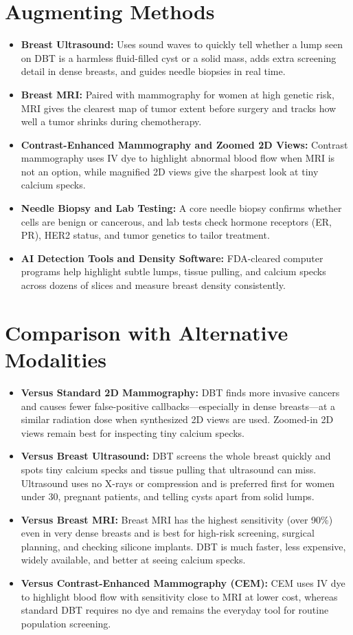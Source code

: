 \section{Augmenting Methods}
\begin{itemize}
\item \textbf{Breast Ultrasound:} Uses sound waves to quickly tell whether a lump seen on DBT is a harmless fluid-filled cyst or a solid mass, adds extra screening detail in dense breasts, and guides needle biopsies in real time.
\item \textbf{Breast MRI:} Paired with mammography for women at high genetic risk, MRI gives the clearest map of tumor extent before surgery and tracks how well a tumor shrinks during chemotherapy.
\item \textbf{Contrast-Enhanced Mammography and Zoomed 2D Views:} Contrast mammography uses IV dye to highlight abnormal blood flow when MRI is not an option, while magnified 2D views give the sharpest look at tiny calcium specks.
\item \textbf{Needle Biopsy and Lab Testing:} A core needle biopsy confirms whether cells are benign or cancerous, and lab tests check hormone receptors (ER, PR), HER2 status, and tumor genetics to tailor treatment.
\item \textbf{AI Detection Tools and Density Software:} FDA-cleared computer programs help highlight subtle lumps, tissue pulling, and calcium specks across dozens of slices and measure breast density consistently.
\end{itemize}

\section{Comparison with Alternative Modalities}
\begin{itemize}
\item \textbf{Versus Standard 2D Mammography:} DBT finds more invasive cancers and causes fewer false-positive callbacks---especially in dense breasts---at a similar radiation dose when synthesized 2D views are used. Zoomed-in 2D views remain best for inspecting tiny calcium specks.
\item \textbf{Versus Breast Ultrasound:} DBT screens the whole breast quickly and spots tiny calcium specks and tissue pulling that ultrasound can miss. Ultrasound uses no X-rays or compression and is preferred first for women under 30, pregnant patients, and telling cysts apart from solid lumps.
\item \textbf{Versus Breast MRI:} Breast MRI has the highest sensitivity (over 90\%) even in very dense breasts and is best for high-risk screening, surgical planning, and checking silicone implants. DBT is much faster, less expensive, widely available, and better at seeing calcium specks.
\item \textbf{Versus Contrast-Enhanced Mammography (CEM):} CEM uses IV dye to highlight blood flow with sensitivity close to MRI at lower cost, whereas standard DBT requires no dye and remains the everyday tool for routine population screening.
\end{itemize}

